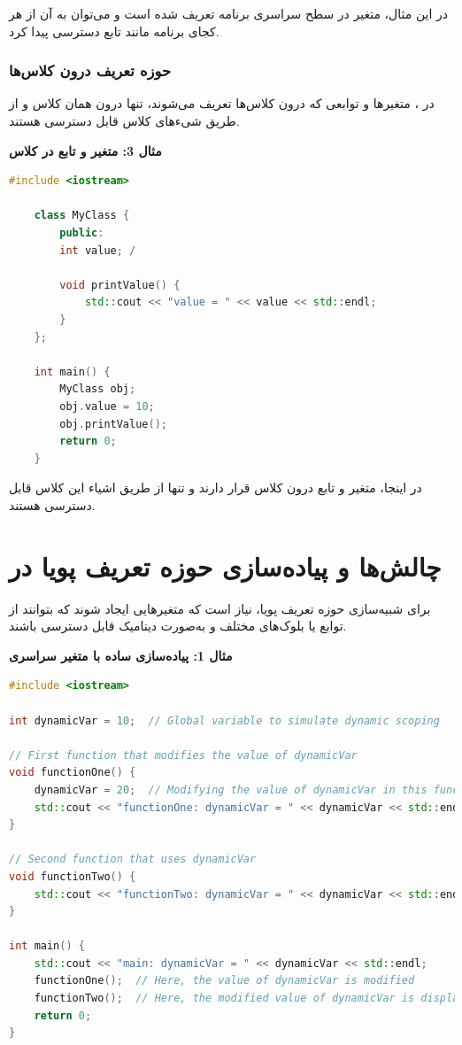 \documentclass[12pt, a4paper]{report}
\begin{document}
در این مثال، متغیر  در سطح سراسری برنامه تعریف شده است و می‌توان به آن از هر کجای برنامه مانند تابع  دسترسی پیدا کرد.

\subsubsection{حوزه تعریف درون کلاس‌ها }
در ، متغیرها و توابعی که درون کلاس‌ها تعریف می‌شوند، تنها درون همان کلاس و از طریق شیءهای کلاس قابل دسترسی هستند.

\textbf{مثال 3: متغیر و تابع در کلاس}
\LTR
\begin{lstlisting}[language=C++, breaklines=true]
	#include <iostream>
	
	class MyClass {
		public:
		int value; /
		
		void printValue() { 
			std::cout << "value = " << value << std::endl;
		}
	};
	
	int main() {
		MyClass obj;
		obj.value = 10;
		obj.printValue(); 
		return 0;
	}
\end{lstlisting}
\RTL
در اینجا، متغیر  و تابع  درون کلاس  قرار دارند و تنها از طریق اشیاء این کلاس قابل دسترسی هستند.

\section{چالش‌ها و پیاده‌سازی حوزه تعریف پویا در }
برای شبیه‌سازی حوزه تعریف پویا، نیاز است که متغیرهایی ایجاد شوند که بتوانند از توابع یا بلوک‌های مختلف و به‌صورت دینامیک قابل دسترسی باشند.

\textbf{مثال 1: پیاده‌سازی ساده با متغیر سراسری}
\LTR
\begin{lstlisting}[language=C++, breaklines=true]
#include <iostream>

int dynamicVar = 10;  // Global variable to simulate dynamic scoping

// First function that modifies the value of dynamicVar
void functionOne() {
	dynamicVar = 20;  // Modifying the value of dynamicVar in this function
	std::cout << "functionOne: dynamicVar = " << dynamicVar << std::endl;
}

// Second function that uses dynamicVar
void functionTwo() {
	std::cout << "functionTwo: dynamicVar = " << dynamicVar << std::endl;
}

int main() {
	std::cout << "main: dynamicVar = " << dynamicVar << std::endl;
	functionOne();  // Here, the value of dynamicVar is modified
	functionTwo();  // Here, the modified value of dynamicVar is displayed
	return 0;
}

\end{lstlisting}
\RTL
\end{document}
